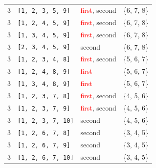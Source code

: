 \begin{longtable}{|p{2.5cm}|p{3cm}|p{2.5cm}|c|}
\rowcolor{Light_Blue}
3 & \texttt{[1, 2, 3, 5, 9]} & \textcolor{red}{first}, \textcolor{CustomBlue}{second} & \{6, 7, 8\} \\ 
3 & \texttt{[1, 2, 4, 5, 9]} & \textcolor{red}{first}, \textcolor{CustomBlue}{second} & \{6, 7, 8\} \\ 
3 & \texttt{[1, 3, 4, 5, 9]} & \textcolor{red}{first}, \textcolor{CustomBlue}{second} & \{6, 7, 8\} \\ 
3 & \texttt{[2, 3, 4, 5, 9]} & \textcolor{CustomBlue}{second} & \{6, 7, 8\} \\ \hline \hline 

\rowcolor{Light_Blue}
3 & \texttt{[1, 2, 3, 4, 8]} & \textcolor{red}{first}, \textcolor{CustomBlue}{second} & \{5, 6, 7\} \\ 
3 & \texttt{[1, 2, 4, 8, 9]} & \textcolor{red}{first} & \{5, 6, 7\} \\ 
3 & \texttt{[1, 3, 4, 8, 9]} & \textcolor{red}{first} & \{5, 6, 7\} \\ \hline \hline

\rowcolor{Light_Blue}
3 & \texttt{[1, 2, 3, 7, 8]} & \textcolor{red}{first}, \textcolor{CustomBlue}{second} & \{4, 5, 6\} \\ 
3 & \texttt{[1, 2, 3, 7, 9]} & \textcolor{red}{first}, \textcolor{CustomBlue}{second} & \{4, 5, 6\} \\ 
3 & \texttt{[1, 2, 3, 7, 10]} & \textcolor{CustomBlue}{second} & \{4, 5, 6\} \\ \hline \hline

\rowcolor{Light_Blue}
3 & \texttt{[1, 2, 6, 7, 8]} & \textcolor{CustomBlue}{second} & \{3, 4, 5\} \\ 
3 & \texttt{[1, 2, 6, 7, 9]} & \textcolor{CustomBlue}{second} & \{3, 4, 5\} \\ 
3 & \texttt{[1, 2, 6, 7, 10]} & \textcolor{CustomBlue}{second} & \{3, 4, 5\} \\ \hline \hline


\end{longtable}
